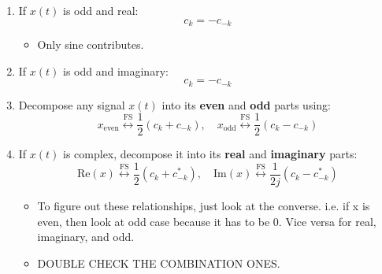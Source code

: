 \begin{intuition}
\begin{enumerate}
        \item If \( x(t) \) is odd and real: 
        \begin{equation*}
            c_k = -c_{-k}
        \end{equation*}
        \begin{itemize}
            \item Only sine contributes.
        \end{itemize}
    
        \item If \( x(t) \) is odd and imaginary: 
        \begin{equation*}
            c_k = - c_{-k}
        \end{equation*}

        \item Decompose any signal \(x(t)\) into its \textbf{even} and \textbf{odd} parts using:
            \[
            x_{\text{even}} \overset{\text{FS}}{\longleftrightarrow} \frac{1}{2} (c_k + c_{-k}), \quad x_{\text{odd}} \overset{\text{FS}}{\longleftrightarrow} \frac{1}{2} (c_k - c_{-k})
            \]

        \item  If \(x(t)\) is complex, decompose it into its \textbf{real} and \textbf{imaginary} parts:
        \[
        \text{Re}(x) \overset{\text{FS}}{\longleftrightarrow} \frac{1}{2}(c_k + c_{-k}^*), \quad \text{Im}(x) \overset{\text{FS}}{\longleftrightarrow} \frac{1}{2j}(c_k - c_{-k}^*)
        \]

        \begin{itemize}
            \item To figure out these relationships, just look at the converse. i.e. if x is even, then look at odd case because it has to be 0. Vice versa for real, imaginary, and odd.
            \item DOUBLE CHECK THE COMBINATION ONES.
        \end{itemize}

    \end{enumerate}
    
\end{intuition}